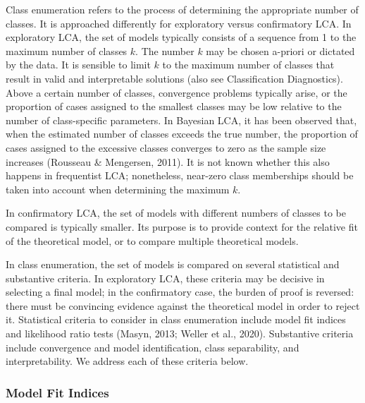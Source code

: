 \documentclass[
  ,man,floatsintext]{apa6}
\begin{document}
Class enumeration refers to the process of determining the appropriate number of classes.
It is approached differently for exploratory versus confirmatory LCA.
In exploratory LCA, the set of models typically consists of a sequence from 1 to the maximum number of classes \(k\).
The number \(k\) may be chosen a-priori or dictated by the data.
It is sensible to limit \(k\) to the maximum number of classes that result in valid and interpretable solutions (also see Classification Diagnostics).
Above a certain number of classes,
convergence problems typically arise,
or the proportion of cases assigned to the smallest classes may be low relative to the number of class-specific parameters.
In Bayesian LCA, it has been observed that, when the estimated number of classes exceeds the true number,
the proportion of cases assigned to the excessive classes converges to zero as the sample size increases (Rousseau \& Mengersen, 2011).
It is not known whether this also happens in frequentist LCA;
nonetheless, near-zero class memberships should be taken into account when determining the maximum \(k\).

In confirmatory LCA,
the set of models with different numbers of classes to be compared is typically smaller.
Its purpose is to provide context for the relative fit of the theoretical model, or to compare multiple theoretical models.

In class enumeration, the set of models is compared on several statistical and substantive criteria.
In exploratory LCA, these criteria may be decisive in selecting a final model;
in the confirmatory case, the burden of proof is reversed: there must be convincing evidence against the theoretical model in order to reject it.
Statistical criteria to consider in class enumeration include model fit indices and
likelihood ratio tests (Masyn, 2013; Weller et al., 2020).
Substantive criteria include convergence and model identification,
class separability,
and interpretability.
We address each of these criteria below.

\hypertarget{model-fit-indices}{%
\subsubsection{Model Fit Indices}\label{model-fit-indices}}
\end{document}
